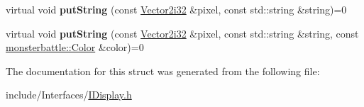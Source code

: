\begin{DoxyCompactItemize}
\item 
\mbox{\label{structmonsterbattle_1_1IDisplay_a67ae99a5842b68d6e129a9aaa37ce06e}} 
virtual void {\bfseries put\+String} (const \hyperlink{structmonsterbattle_1_1Vector}{Vector2i32} \&pixel, const std\+::string \&string)=0
\item 
\mbox{\label{structmonsterbattle_1_1IDisplay_a7ae59cd437a42aed946133126d57feb9}} 
virtual void {\bfseries put\+String} (const \hyperlink{structmonsterbattle_1_1Vector}{Vector2i32} \&pixel, const std\+::string \&string, const \hyperlink{structmonsterbattle_1_1Color}{monsterbattle\+::\+Color} \&color)=0
\end{DoxyCompactItemize}


The documentation for this struct was generated from the following file\+:\begin{DoxyCompactItemize}
\item 
include/\+Interfaces/\hyperlink{IDisplay_8h}{I\+Display.\+h}\end{DoxyCompactItemize}
